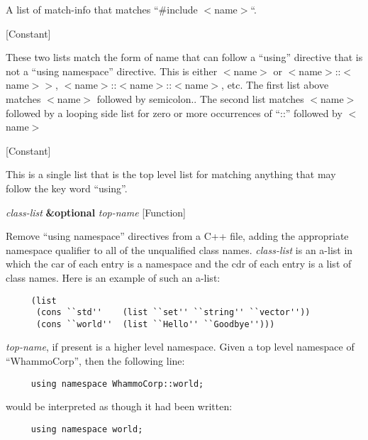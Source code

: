 \begin{doc-string}
A list of match-info that matches ``\#include $<$name$>$``.
\end{doc-string}

\vspace{1em}
\noindent
{}
\usebox{\funcname}
 \hfill [Constant]

\begin{doc-string}
These two lists match the form of name that can follow a ``using'' directive
that is not a ``using namespace'' directive.  This is either $<$name$>$ or
$<$name$>$::$<$name$>$$>$, $<$name$>$::$<$name$>$::$<$name$>$, etc.  The first list above matches
$<$name$>$ followed by semicolon..  The second list matches $<$name$>$ followed
by a looping side list for zero or more occurrences of ``::'' followed by $<$name$>$
\end{doc-string}

\vspace{1em}
\noindent
{}
\usebox{\funcname}
 \hfill [Constant]

\begin{doc-string}
This is a single list that is the top level list for matching anything
that may follow the key word ``using''.
\end{doc-string}

\vspace{1em}
\noindent
{}
\usebox{\funcname}\emph{class-list} \textbf{\&optional} \emph{top-name}
 \hfill [Function]

\begin{doc-string}
Remove ``using namespace'' directives from a C++ file, adding the appropriate
namespace qualifier to all of the unqualified class names.  \emph{class-list} is an
a-list in which the car of each entry is a namespace and the cdr of each entry
is a list of class names.  Here is an example of such an a-list:

\small{\begin{verbatim}
     (list
      (cons ``std''    (list ``set'' ``string'' ``vector''))
      (cons ``world''  (list ``Hello'' ``Goodbye'')))
\end{verbatim}}

\emph{top-name}, if present is a higher level namespace.  Given a top level namespace
of ``WhammoCorp'', then the following line:

\small{\begin{verbatim}
     using namespace WhammoCorp::world;
\end{verbatim}}

would be interpreted as though it had been written:

\small{\begin{verbatim}
     using namespace world;
\end{verbatim}}
\end{doc-string}

